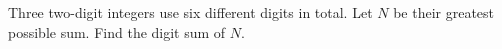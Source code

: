 Three two-digit integers use six different digits in total. Let $N$ be their greatest possible sum. Find the digit sum of $N$.
